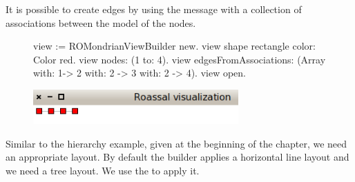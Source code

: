 \documentclass[a4paper,10pt,twoside]{book}
\begin{document}


It is possible to create edges by using the  message with a collection of associations between the model of the nodes.

\begin{figure}[H]
      \begin{minipage}[t]{1\textwidth}
      \vspace{0pt}
\begin{code}{}
view := ROMondrianViewBuilder new.
view shape rectangle 
	color: Color red.
view nodes: (1 to: 4).
view edgesFromAssociations: (Array with: 1-> 2 with: 2 -> 3 with: 2 -> 4).
view open.
\end{code}
   \end{minipage}
   \hfill
   \begin{minipage}[t]{1\textwidth}
	 \vspace{0pt} \raggedright
       \centering
		\includegraphics[width=0.7\textwidth]{mondrian5}
   \end{minipage}
\label{fig:mondrian5}
\end{figure} 



Similar to the  hierarchy example, given at the beginning of the chapter, we need an appropriate layout. By default the builder applies a horizontal line layout and we need a tree layout. We use the  to apply it.
\end{document}
